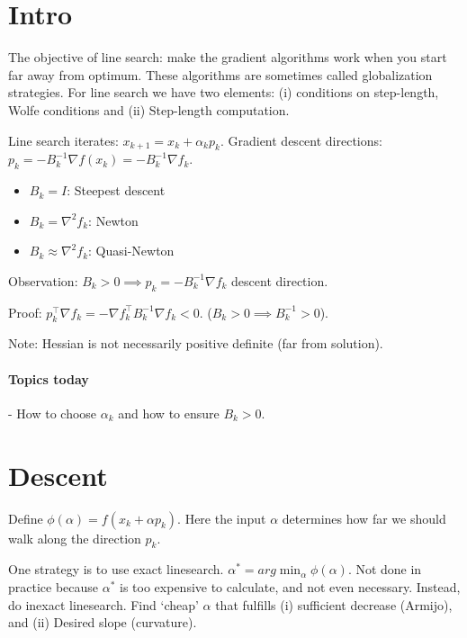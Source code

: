 \documentclass{article}
\begin{document}
\maketitle

\section{Intro}

\medskip The objective of line search: make the gradient algorithms work when you start far away from optimum.
These algorithms are sometimes called globalization strategies. For line search we have two elements: (i) conditions on step-length, Wolfe conditions and (ii) Step-length computation.


\medskip Line search iterates: $x_{k+1} = x_k + \alpha_k p_k$. Gradient descent directions: $p_k = -B_k^{-1} \nabla f(x_k) = -B_k^{-1}\nabla f_k$.
\begin{itemize}
  \item $B_k = I$: Steepest descent
  \item $B_k = \nabla ^2 f_k$: Newton
  \item $B_k \approx \nabla ^2 f_k$: Quasi-Newton
\end{itemize}

Observation: $B_k > 0 \implies p_k = -B_k^{-1} \nabla f_k$ descent direction.

Proof: $p_k^{\top} \nabla f_k = - \nabla f_k^{\top} B_k^{-1} \nabla f_k < 0$.   ($B_k > 0 \implies B_k^{-1} > 0$).

Note: Hessian is not necessarily positive definite (far from solution).

\paragraph{Topics today}- How to choose $\alpha_k$ and how to ensure $B_k > 0$.


\section{Descent}

Define $\phi(\alpha) = f(x_k + \alpha p_k)$. Here the input $\alpha$ determines how far we should walk along the direction $p_k$.

One strategy is to use exact linesearch. $\alpha^* = arg \min_{\alpha}\phi (\alpha)$. Not done in practice because $\alpha^*$ is too expensive to calculate, and not even necessary.
Instead, do inexact linesearch. Find `cheap' $\alpha$ that fulfills (i) sufficient decrease (Armijo), and (ii) Desired slope (curvature).
\end{document}
